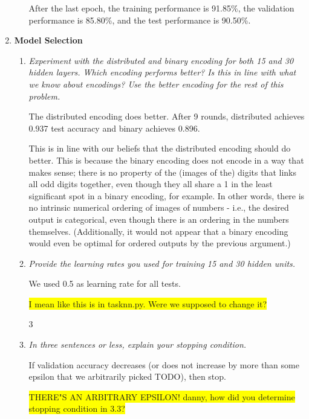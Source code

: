 \documentclass{article}
\newcommand{\edit}[1]{\colorbox{Yellow}{#1}}
\begin{document}
\begin{enumerate}
\begin{enumerate}
      After the last epoch, the training performance is 91.85\%, the
      validation performance is 85.80\%, and the test performance is
      90.50\%.
    \end{enumerate}

  \item \textbf{Model Selection}
    \begin{enumerate}
    \item \textit{Experiment with the distributed and binary encoding
      for both 15 and 30 hidden layers. Which encoding performs
      better? Is this in line with what we know about encodings? Use
      the better encoding for the rest of this problem.}

      The distributed encoding does better. After 9 rounds, distributed
      achieves 0.937 test accuracy and binary achieves 0.896. 

      This is in line with our beliefs that the distributed encoding
      should do better. This is because the binary encoding does not
      encode in a way that makes sense; there is no property of the
      (images of the) digits that links all odd digits together, even
      though they all share a 1 in the least significant spot in a
      binary encoding, for example. In other words, there is no
      intrinsic numerical ordering of images of numbers - i.e., the
      desired output is categorical, even though there is an ordering
      in the numbers themselves.  (Additionally, it would not appear
      that a binary encoding would even be optimal for ordered outputs
      by the previous argument.)

    \item \textit{Provide the learning rates you used for training 15
      and 30 hidden units.}
      
      We used 0.5 as learning rate for all tests.

\edit{I mean like this is in tasknn.py. Were we supposed to change it?} 

      \setcounter{enumii}3

    \item \textit{In three sentences or less, explain your stopping
      condition.}

      If validation accuracy decreases (or does not increase by more than
      some epsilon that we arbitrarily picked TODO), then stop. 
      
      \edit{THERE"S AN ARBITRARY EPSILON! danny, how did you determine stopping
      condition in 3.3?}


\end{enumerate}
\end{enumerate}
\end{document}
